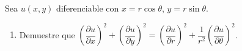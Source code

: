 Sea $u(x, y)$ diferenciable con $x = r\cos\theta$, $y = r\sin\theta$.
\begin{enumerate}
    \item Demuestre que $\left(\dfrac{\partial u}{\partial x}\right)^2 + \left(\dfrac{\partial u}{\partial y}\right)^2 = \left(\dfrac{\partial u}{\partial r}\right)^2 + \dfrac{1}{r^2}\left(\dfrac{\partial u}{\partial \theta}\right)^2$.
\end{enumerate}
